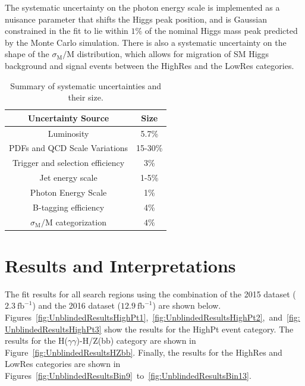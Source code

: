 The systematic uncertainty on the photon energy scale is implemented as a nuisance parameter
that shifts the Higgs peak position, and is Gaussian constrained in the fit to lie within $1\%$ of the nominal 
Higgs mass peak predicted by the Monte Carlo simulation. There is also a systematic uncertainty 
on the shape of the $\sigma_{\mathrm{M}}/\mathrm{M}$ distribution, which allows for migration of 
SM Higgs background and signal events between the HighRes and the LowRes categories.

\begin{table}[!ht]
\begin{center}
\caption{Summary of systematic uncertainties and their size.}
\label{tab:SignalSystematics}
\begin{tabular}{|c|c|}
\hline
Uncertainty Source & Size \\
\hline
Luminosity                                 & 5.7\% \\
PDFs and QCD Scale Variations              & 15-30\%\\
Trigger and selection efficiency            & 3\% \\
Jet energy scale                           & 1-5\% \\
Photon Energy Scale                        & 1\% \\
B-tagging efficiency                       & 4\% \\
$\sigma_{\mathrm{M}}/\mathrm{M}$ categorization & $4\%$ \\
\hline
\end{tabular}
\end{center}
\end{table}



\section{Results and Interpretations}
\label{sec:results}

The fit results for all search regions using the combination of the 2015 dataset ($2.3~\mathrm{fb}^{-1}$)
and the 2016 dataset ($12.9~\mathrm{fb}^{-1}$) are shown below.
Figures~\ref{fig:UnblindedResultsHighPt1},~\ref{fig:UnblindedResultsHighPt2},~and~\ref{fig:UnblindedResultsHighPt3}
show the results for the HighPt event category. 
The results for the H($\gamma\gamma$)-H/Z(bb) category are shown in Figure~\ref{fig:UnblindedResultsHZbb}.
Finally, the results for the HighRes and LowRes categories are shown in 
Figures~\ref{fig:UnblindedResultsBin9}~to~\ref{fig:UnblindedResultsBin13}.

